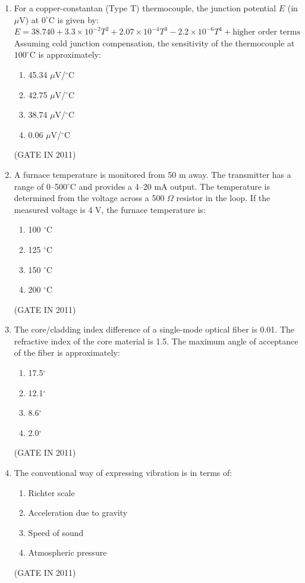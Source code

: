 \documentclass[journal]{IEEEtran}
\begin{document}
\begin{enumerate}
\item For a copper-constantan (Type T) thermocouple, the junction potential $E$ (in $\mu$V) at $0^\circ$C is given by:  
$E = 38.740 + 3.3 \times 10^{-2} T^2 + 2.07 \times 10^{-4} T^3 - 2.2 \times 10^{-6} T^4 + \text{higher order terms}$  
Assuming cold junction compensation, the sensitivity of the thermocouple at $100^\circ$C is approximately:
\begin{multicols}{4}
\begin{enumerate}
\item 45.34 $\mu$V/$^\circ$C  
\item 42.75 $\mu$V/$^\circ$C  
\item 38.74 $\mu$V/$^\circ$C  
\item 0.06 $\mu$V/$^\circ$C
\end{enumerate}
\end{multicols} \hfill(GATE IN 2011)

\item A furnace temperature is monitored from 50 m away. The transmitter has a range of 0–500$^\circ$C and provides a 4–20 mA output. The temperature is determined from the voltage across a 500 $\Omega$ resistor in the loop. If the measured voltage is 4 V, the furnace temperature is:
\begin{multicols}{4}
\begin{enumerate}
\item 100 $^\circ$C  
\item 125 $^\circ$C  
\item 150 $^\circ$C  
\item 200 $^\circ$C
\end{enumerate}
\end{multicols} \hfill(GATE IN 2011)

\item The core/cladding index difference of a single-mode optical fiber is 0.01. The refractive index of the core material is 1.5. The maximum angle of acceptance of the fiber is approximately:
\begin{multicols}{4}
\begin{enumerate}
\item 17.5$^\circ$  
\item 12.1$^\circ$  
\item 8.6$^\circ$  
\item 2.0$^\circ$
\end{enumerate}
\end{multicols} \hfill(GATE IN 2011)

\item The conventional way of expressing vibration is in terms of:
\begin{multicols}{2}
\begin{enumerate}
\item Richter scale  
\item Acceleration due to gravity  
\item Speed of sound  
\item Atmospheric pressure
\end{enumerate}
\end{multicols} \hfill(GATE IN 2011)


\end{enumerate}
\end{document}
